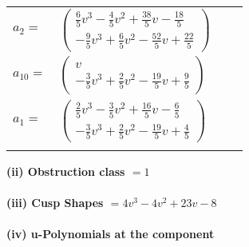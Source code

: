\documentclass[1p]{elsarticle_modified}
\theoremstyle{definition}
\begin{document}
\begin{tabular}{m{7pt} m{180pt} m{7pt} m{180pt} }
\flushright $a_{2}=$&$\begin{pmatrix}\frac{6}{5} v^3-\frac{4}{5} v^2+\frac{38}{5} v-\frac{18}{5}\\-\frac{9}{5} v^3+\frac{6}{5} v^2-\frac{52}{5} v+\frac{22}{5}\end{pmatrix}$ \\
\flushright $a_{10}=$&$\begin{pmatrix}v\\-\frac{3}{5} v^3+\frac{2}{5} v^2-\frac{19}{5} v+\frac{9}{5}\end{pmatrix}$ \\
\flushright $a_{1}=$&$\begin{pmatrix}\frac{2}{5} v^3-\frac{3}{5} v^2+\frac{16}{5} v-\frac{6}{5}\\-\frac{3}{5} v^3+\frac{2}{5} v^2-\frac{19}{5} v+\frac{4}{5}\end{pmatrix}$\\&\end{tabular}
\flushleft \textbf{(ii) Obstruction class $= 1$}\\~\\
\flushleft \textbf{(iii) Cusp Shapes $= 4 v^3-4 v^2+23 v-8$}\\~\\
\newpage\renewcommand{\arraystretch}{1}
\flushleft \textbf{(iv) u-Polynomials at the component}\newline \\
\end{document}
